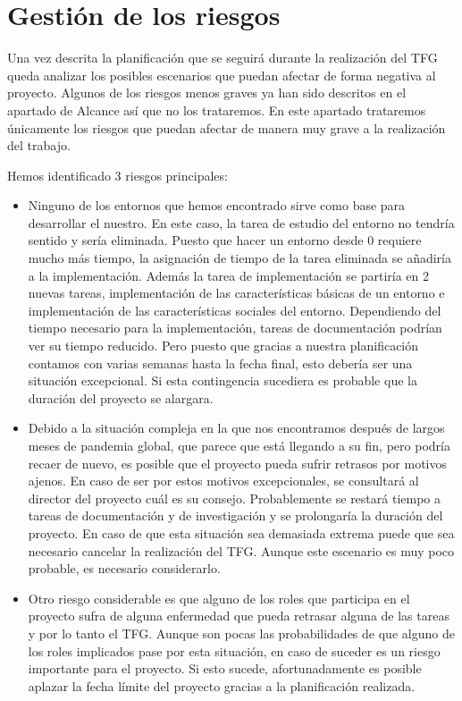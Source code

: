 \section{Gestión de los riesgos}
Una vez descrita la planificación que se seguirá durante la realización del TFG queda analizar los posibles escenarios que puedan afectar de forma negativa al proyecto. Algunos de los riesgos menos graves ya han sido descritos en el apartado de Alcance así que no los trataremos. En este apartado trataremos únicamente los riesgos que puedan afectar de manera muy grave a la realización del trabajo.  

Hemos identificado 3 riesgos principales:
\begin{itemize}
    \item Ninguno de los entornos que hemos encontrado sirve como base para desarrollar el nuestro. En este caso, la tarea de estudio del entorno no tendría sentido y sería eliminada. Puesto que hacer un entorno desde 0 requiere mucho más tiempo, la asignación de tiempo de la tarea eliminada se añadiría a la implementación. Además la tarea de implementación se partiría en 2 nuevas tareas, implementación de las características básicas de un entorno e implementación de las características sociales del entorno. Dependiendo del tiempo necesario para la implementación, tareas de documentación podrían ver su tiempo reducido. Pero puesto que gracias a nuestra planificación contamos con varias semanas hasta la fecha final, esto debería ser una situación excepcional. Si esta contingencia sucediera es probable que la duración del proyecto se alargara.
    
    \item Debido a la situación compleja en la que nos encontramos después de largos meses de pandemia global, que parece que está llegando a su fin, pero podría recaer de nuevo, es posible que el proyecto pueda sufrir retrasos por motivos ajenos. En caso de ser por estos motivos excepcionales, se consultará al director del proyecto cuál es su consejo. Probablemente se restará tiempo a tareas de documentación y de investigación y se prolongaría la duración del proyecto. En caso de que esta situación sea demasiada extrema puede que sea necesario cancelar la realización del TFG. Aunque este escenario es muy poco probable, es necesario considerarlo.
    
    \item Otro riesgo considerable es que alguno de los roles que participa en el proyecto sufra de alguna enfermedad que pueda retrasar alguna de las tareas y por lo tanto el TFG. Aunque son pocas las probabilidades de que alguno de los roles implicados pase por esta situación, en caso de suceder es un riesgo importante para el proyecto. Si esto sucede, afortunadamente es posible aplazar la fecha límite del proyecto gracias a la planificación realizada.
\end{itemize}